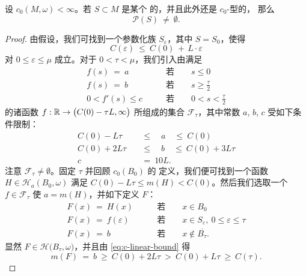 \begin{theorem}\label{thm:lipschitz-boundary-closed}
设 $c_{0}(M,\omega)<\infty$。若\trCompact\trHypersurface{} $S\subset M$ 是某个%
\trSymplecticManifold{}的\trBoundary，并且此外还是 $c_{0}$-\trLipschitz{}型的，%
那么
\[
\mathcal{P}(S)\ \neq\ \emptyset.
\]
\end{theorem}

\begin{proof}
由假设，我们可找到一个参数化族 $S_{\varepsilon}$，其中 $S=S_{0}$，使得
\begin{equation}\label{eq:c-linear-bound}
C(\varepsilon)\ \leq\ C(0)\,+\,L\cdot\varepsilon
\end{equation}
对 $0\leq\varepsilon\leq\mu$ 成立。对于 $0<\tau<\mu$，我们引入由满足
\begin{align*}
f(s)\ =\ a \qquad & \text{若}\qquad s\leq0\\
f(s)\ =\ b \qquad & \text{若}\qquad s\geq\tfrac{\tau}{2}\\
0<f'(s)\leq c \qquad & \text{若}\qquad 0<s<\tfrac{\tau}{2}
\end{align*}
的诸\trSmooth{}函数 $f:\mathbb{R}\to\bigl(C(0)-\tau L,\infty\bigr)$ 所组成的集合%
$\mathcal{F}_{\tau}$，其中常数 $a$, $b$, $c$ 受如下条件限制：
\begin{align*}
C(0)-L\tau \quad &\leq\quad a \quad\leq\ C(0)\\
C(0)+2L\tau \quad &\leq\quad b \quad\leq\ C(0)+3L\tau\\
c\ &=\ 10L.
\end{align*}
注意 $\mathcal{F}_{\tau}\neq\emptyset$。固定 $\tau$ 并回顾 $c_{0}(B_{0})$ 的%
定义，我们便可找到一个\trAdmissible{}函数 $H\in\mathcal{H}_{a}(B_{0},\omega)$%
满足 $C(0)-L\tau\leq m(H)<C(0)$。然后我们选取一个 $f\in\mathcal{F}_{\tau}$%
使 $a=m(H)$，并如下定义\trHamiltonianFunction{} $F$：
\begin{align*}
F(x)\ =\ H(x) \qquad & \text{若}\qquad x\in B_{0}\\
F(x)\ =\ f(\varepsilon) \qquad & \text{若}\qquad x\in S_{\varepsilon},\
0\leq\varepsilon\leq\tau\\
F(x)\ =\ b \qquad & \text{若}\qquad x\notin\overline{B_{\tau}}.
\end{align*}
显然 $F\in\mathcal{H}\bigl(B_{\tau},\omega\bigr)$，并且由%
\eqref{eq:c-linear-bound} 得
\[
m(F)\ =\ b\ \geq\ C(0)+2L\tau\ >\ C(0)+L\tau\ \geq\ C(\tau).
\]


\end{proof}
